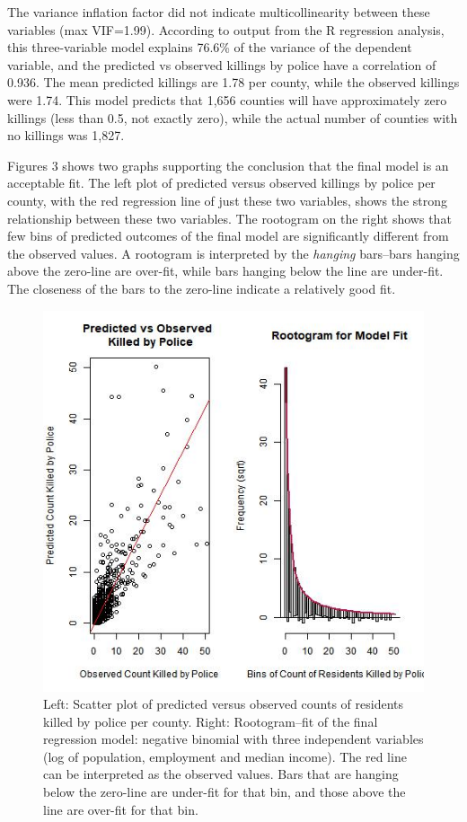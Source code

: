 \documentclass[sigconf]{acmart}
\begin{document}
The variance inflation factor did not indicate multicollinearity between these variables (max VIF=1.99). \cite{kaminski05,nix17} According to output from the R regression analysis, this three-variable model explains 76.6\% of the variance of the dependent variable, and the predicted vs observed killings by police have a correlation of 0.936.  The mean predicted killings are 1.78 per county, while the observed killings were 1.74.  This model predicts that 1,656 counties will have approximately zero killings (less than 0.5, not exactly zero), while the actual number of counties with no killings was 1,827. \cite{beaujean16}

Figures 3 shows two graphs supporting the conclusion that the final model is an acceptable fit.  The left plot of predicted versus observed killings by police per county, with the red regression line of just these two variables, shows the strong relationship between these two variables.  The rootogram on the right shows that few bins of predicted outcomes of the final model are significantly different from the observed values.  A rootogram is interpreted by the {\em hanging} bars--bars hanging above the zero-line are over-fit, while bars hanging below the line are under-fit. \cite{rootogram}  The closeness of the bars to the zero-line indicate a relatively good fit.

\begin{figure}
\includegraphics[width=1.0\textwidth]{images/figure3.jpg}
\caption{Left: Scatter plot of predicted versus observed counts of residents killed by police per county. Right: Rootogram--fit of the final regression model: negative binomial with three independent variables (log of population, employment and median income).  The red line can be interpreted as the observed values.  Bars that are hanging below the zero-line are under-fit for that bin, and those above the line are over-fit for that bin.}
\end{figure}
\end{document}
